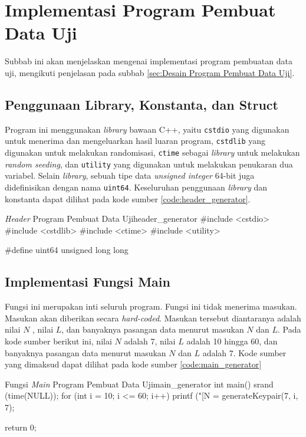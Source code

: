 \section{Implementasi Program Pembuat Data Uji}

Subbab ini akan menjelaskan mengenai implementasi program pembuatan data uji, mengikuti penjelasan pada subbab \ref{sec:Desain Program Pembuat Data Uji}.

\subsection{Penggunaan Library, Konstanta, dan Struct}

Program ini menggunakan \textit{library} bawaan C++, yaitu \texttt{cstdio} yang digunakan untuk menerima dan mengeluarkan hasil luaran program, \texttt{cstdlib} yang digunakan untuk melakukan randomisasi, \texttt{ctime} sebagai \textit{library} untuk melakukan \textit{random seeding}, dan \texttt{utility} yang digunakan untuk melakukan penukaran dua variabel. Selain \textit{library}, sebuah tipe data \textit{unsigned integer} 64-bit juga didefinisikan dengan nama \texttt{uint64}. Keseluruhan penggunaan \textit{library} dan konstanta dapat dilihat pada kode sumber \ref{code:header_generator}.
\begin{code}[firstnumber=1]{\textit{Header} Program Pembuat Data Uji}{header_generator}
#include <cstdio>
#include <cstdlib>
#include <ctime>
#include <utility>

#define uint64 unsigned long long
\end{code}

\subsection{Implementasi Fungsi Main}

Fungsi ini merupakan inti seluruh program. Fungsi ini tidak menerima masukan. Masukan akan diberikan secara \textit{hard-coded}. Masukan tersebut diantaranya adalah nilai $ N $ , nilai $ L $, dan banyaknya pasangan data menurut masukan $ N $ dan $ L $. Pada kode sumber berikut ini, nilai $ N $ adalah 7, nilai $ L $ adalah 10 hingga 60, dan banyaknya pasangan data menurut masukan $ N $ dan $ L $ adalah 7. Kode sumber yang dimaksud dapat dilihat pada kode sumber \ref{code:main_generator}
\begin{code}[firstnumber=0]{Fungsi \textit{Main} Program Pembuat Data Uji}{main_generator}
int main()
srand (time(NULL));
for (int i = 10; i <= 60; i++)
{
	printf ("[N = %
	generateKeypair(7, i, 7);
}

return 0;
\end{code}

